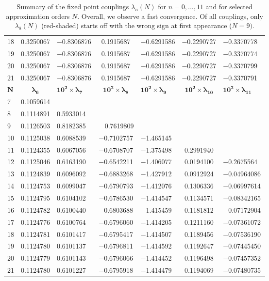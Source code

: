 \documentclass[notitlepage,eqsecnum,bm,amsmath,preprintnumbers,superscriptaddress,nofootinbib,aps,11pt]{revtex4-1}
\begin{document}
\begin{center}
\begin{table*}[t]
{\begin{tabular}{G|c G  c  G  c  G}
 18 & 0.3250067 & $-$0.8306876 & 0.1915687 & $-$0.6291586 & $-$0.2290727 & $-$0.3370778 \\
 19 & 0.3250067 & $-$0.8306876 & 0.1915687 & $-$0.6291586 & $-$0.2290727 & $-$0.3370774 \\
 20 & 0.3250067 & $-$0.8306876 & 0.1915687 & $-$0.6291586 & $-$0.2290727 & $-$0.3370799 \\
 21 & 0.3250067 & $-$0.8306876 & 0.1915687 & $-$0.6291586 & $-$0.2290727 & $-$0.3370791
 \\
 \midrule 
{}$\bm{N}$&
$\bm{\lambda_6}$&
$\bm{10^2\times\lambda_7}$&
$\bm{10^2\times\lambda_8}$&
$\bm{10^2\times\lambda_9}$&
$\bm{10^2\times\lambda_{10}}$&
$\bm{10^2\times \lambda_{11}}$\\
 & 0.1059614 &   &  &   &  &   \\
8 & 0.1114891 & 0.5933014 &  &   &  &   \\
 9 & 0.1126503 & 0.8182385 &  \ \ 0.7619809 &   &  &   \\
 10 & 0.1125038 & 0.6088539 & $-$0.7102757 & $-$1.465145 &  &   \\
 11 & 0.1124355 & 0.6067056 & $-$0.6708707 & $-$1.375498 & 0.2991940 &   \\
 12 & 0.1125046 & 0.6163190 & $-$0.6542211 & $-$1.406077 & 0.0194100%
 & $-$0.2675564\ \, \\
 13 & 0.1124839 & 0.6096092 & $-$0.6883268 & $-$1.427912 & 0.0912924%
& $-$0.04964086 \\
 14 & 0.1124753 & 0.6099047 & $-$0.6790793 & $-$1.412076 & 0.1306336 & $-$0.06997614 \\
 15 & 0.1124795 & 0.6104102 & $-$0.6786530 & $-$1.414547 & 0.1134571 & $-$0.08342165 \\
 16 & 0.1124782 & 0.6100440 & $-$0.6803688 & $-$1.415459 & 0.1181812 & $-$0.07172904 \\
 17 & 0.1124776 & 0.6100764 & $-$0.6796060 & $-$1.414205 & 0.1211160 & $-$0.07361072 \\
 18 & 0.1124781 & 0.6101417 & $-$0.6795417 & $-$1.414507 & 0.1189456 & $-$0.07536190 \\
 19 & 0.1124780 & 0.6101137 & $-$0.6796811 & $-$1.414592 & 0.1192647 & $-$0.07445450 \\
 20 & 0.1124779 & 0.6101143 & $-$0.6796066 & $-$1.414452 & 0.1196498 & $-$0.07457352 \\
 21 & 0.1124780 & 0.6101227 & $-$0.6795918 & $-$1.414479 & 0.1194069 & $-$0.07480735 \\
 \bottomrule 
 \end{tabular}  
}
\caption{\label{FixedPointsScaled} Summary of the fixed point couplings $\lambda_n(N)$ for $n=0,...,11$ and for selected approximation orders $N$. Overall, we observe a fast convergence. Of all couplings, only $\lambda_8(N)$ (red-shaded) starts off with the wrong sign at first appearance ($N=9)$.}
\end{table*} 
\end{center}
\end{document}
